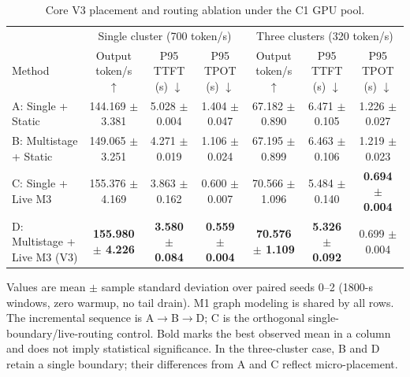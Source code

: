 \documentclass[twocolumn]{article}
\begin{document}
\begin{table}[t]
\caption{Core V3 placement and routing ablation under the C1 GPU pool.}
\label{tab:v3-core-ablation}
\centering
\footnotesize
\setlength{\tabcolsep}{3pt}
\begin{tabular}{@{}lccc@{\hspace{0.65em}\vrule\hspace{0.65em}}ccc@{}}
\toprule
 & \multicolumn{3}{c}{Single cluster (700 token/s)} & \multicolumn{3}{c}{Three clusters (320 token/s)} \\
\cmidrule(lr){2-4}\cmidrule(l){5-7}
Method & \shortstack{Output\\token/s $\uparrow$} & \shortstack{P95 TTFT\\(s) $\downarrow$} & \shortstack{P95 TPOT\\(s) $\downarrow$} & \shortstack{Output\\token/s $\uparrow$} & \shortstack{P95 TTFT\\(s) $\downarrow$} & \shortstack{P95 TPOT\\(s) $\downarrow$} \\
\midrule
A: Single + Static & 144.169 $\pm$ 3.381 & 5.028 $\pm$ 0.004 & 1.404 $\pm$ 0.047 & 67.182 $\pm$ 0.890 & 6.471 $\pm$ 0.105 & 1.226 $\pm$ 0.027 \\
B: Multistage + Static & 149.065 $\pm$ 3.251 & 4.271 $\pm$ 0.019 & 1.106 $\pm$ 0.024 & 67.195 $\pm$ 0.899 & 6.463 $\pm$ 0.106 & 1.219 $\pm$ 0.023 \\
C: Single + Live M3 & 155.376 $\pm$ 4.169 & 3.863 $\pm$ 0.162 & 0.600 $\pm$ 0.007 & 70.566 $\pm$ 1.096 & 5.484 $\pm$ 0.140 & \textbf{0.694 $\pm$ 0.004} \\
D: Multistage + Live M3 (V3) & \textbf{155.980 $\pm$ 4.226} & \textbf{3.580 $\pm$ 0.084} & \textbf{0.559 $\pm$ 0.004} & \textbf{70.576 $\pm$ 1.109} & \textbf{5.326 $\pm$ 0.092} & 0.699 $\pm$ 0.004 \\
\bottomrule
\end{tabular}
\vspace{2pt}
\parbox{\textwidth}{\footnotesize Values are mean $\pm$ sample standard deviation over paired seeds 0--2 (1800-s windows, zero warmup, no tail drain). M1 graph modeling is shared by all rows. The incremental sequence is A$\rightarrow$B$\rightarrow$D; C is the orthogonal single-boundary/live-routing control. Bold marks the best observed mean in a column and does not imply statistical significance. In the three-cluster case, B and D retain a single boundary; their differences from A and C reflect micro-placement.}
\end{table}
\end{document}
